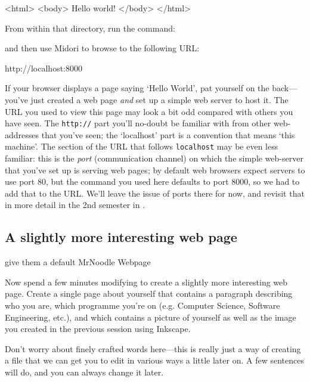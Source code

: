 \begin{ttoutenv}
<html>
<body>
Hello world!
</body>
</html>
\end{ttoutenv}

From within that directory, run the command:


and then use Midori to browse to the following URL:

\begin{ttoutenv}
http://localhost:8000
\end{ttoutenv}

If your browser displays a page saying `Hello World', pat yourself on the back---you've just created a web page \textit{and} set up a simple web server to host it. The URL you used to view this page may look a bit odd compared with others you have seen. The \texttt{http://} part you'll no-doubt be familiar with from other web-addresses that you've seen; the `localhost' part is a convention that means `this machine'. The section of the URL that follows \texttt{localhost} may be even less familiar: this is the \textit{port} (communication channel) on which the simple web-server that you've set up is serving web pages; by default web browsers expect servers to use port 80, but the  command you used here defaults to port 8000, so we had to add that to the URL. We'll leave the issue of ports there for now, and revisit that in more detail in the 2nd semester in . 

\subsection{A slightly more interesting web page}

\begin{note}
give them a default MrNoodle Webpage
\end{note}

Now spend a few minutes modifying  to create a slightly more interesting web page. Create a single page about yourself that contains a paragraph describing who you are, which programme you're on (e.g. Computer Science, Software Engineering, etc.), and which contains a picture of yourself as well as the image you created in the previous session using Inkscape.

Don't worry about finely crafted words here---this is really just a way of creating a file that we can get you to edit in various ways a little later on. A few sentences will do, and you can always change it later. 

